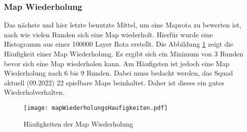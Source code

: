         \subsubsection{Map Wiederholung}
            Das nächste und hier letzte benutzte Mittel, um eine Maprota zu bewerten ist, nach wie vielen Runden sich eine Map
            wiederholt. Hierfür wurde eine Histogramm aus einer 100000 Layer Rota erstellt.
            Die Abbildung \ref{fig:haufigkeit_der_map_wiederholung} zeigt die Häufigkeit einer Map Wiederholung. Es ergibt sich ein
            Minimum von 3 Runden bevor sich eine Map wiederholen kann. Am Häufigsten ist jedoch eine Map Wiederholung nach 6 bis 9 Runden.
            Dabei muss bedacht werden, das Squad aktuell (09.2022) 22 spielbare Maps beinhaltet. Daher ist dieses ein gutes Wiederholverhalten.

            \begin{figure}[htbp]
                \centering
                \texttt{[image: mapWiederholungsHaufigkeiten.pdf]}
                \caption{Häufigkeiten der Map Wiederholung}
                \label{fig:haufigkeit_der_map_wiederholung}
            \end{figure}

